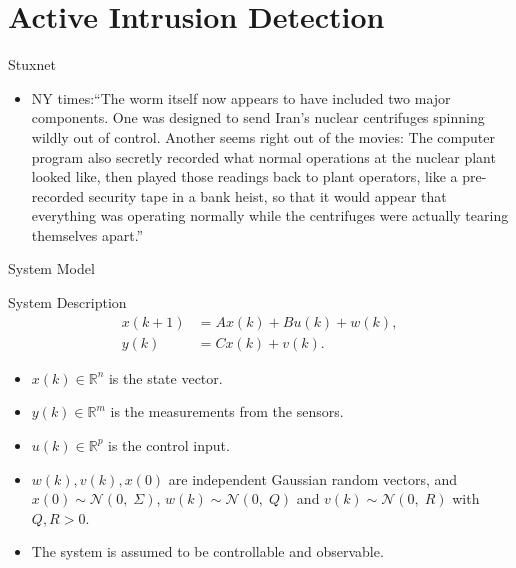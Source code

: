 \documentclass[10pt]{beamer}
\begin{document}
\section{Active Intrusion Detection}

\begin{frame}{Stuxnet}
  \begin{itemize}
    \item NY times:``The worm itself now appears to have included two major components. One was designed to send Iran's nuclear centrifuges spinning wildly out of control. Another seems right out of the movies: The computer program also \alert{secretly recorded what normal operations at the nuclear plant looked like, then played those readings back to plant operators}, like a pre-recorded security tape in a bank heist, so that it would appear that everything was operating normally while the centrifuges were actually tearing themselves apart.''
  \end{itemize}
\end{frame}

\begin{frame}{System Model}
  \begin{block}{System Description}
    \begin{displaymath}
      \begin{split}
	x(k+1) &= Ax(k)  + Bu(k)+w(k),\\
	y(k) &= C x(k) + v(k).
      \end{split}
    \end{displaymath}
  \end{block}
  \begin{itemize}
    \item $x(k) \in \mathbb R^n$ is the state vector.
    \item  $y(k) \in \mathbb R^m$ is the measurements from the sensors.
    \item  $u(k) \in \mathbb R^p$ is the control input.
    \item $w(k),v(k),x(0)$ are independent Gaussian random vectors, and $x(0) \sim \mathcal N(0,\;\Sigma)$, $w(k) \sim \mathcal N(0,\;Q)$ and $v(k) \sim \mathcal N(0,\;R)$ with $Q,R>0$.
    \item The system is assumed to be controllable and observable.
  \end{itemize}
\end{frame}
\end{document}
